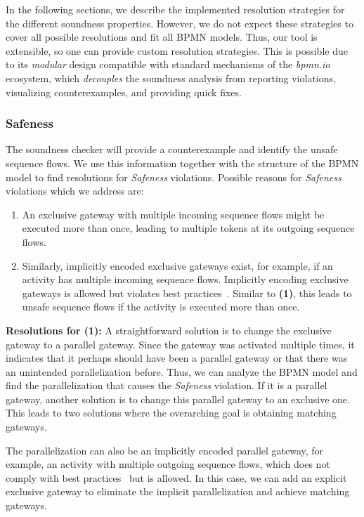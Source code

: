 \documentclass[runningheads]{llncs}
\begin{document}
In the following sections, we describe the implemented resolution strategies for the different soundness properties.
However, we do not expect these strategies to cover all possible resolutions and fit all BPMN models.
Thus, our tool is extensible, so one can provide custom resolution strategies.
This is possible due to its \textit{modular} design compatible with standard mechanisms of the \textit{bpmn.io} ecosystem, which \textit{decouples} the soundness analysis from reporting violations, visualizing counterexamples, and providing quick fixes.

\subsubsection{Safeness}
The soundness checker will provide a counterexample and identify the unsafe sequence flows.
We use this information together with the structure of the BPMN model to find resolutions for \textit{Safeness} violations.
Possible reasons for \textit{Safeness} violations which we address are:

\begin{enumerate}
	\item An exclusive gateway with multiple incoming sequence flows might be executed more than once, leading to multiple tokens at its outgoing sequence flows.
	\item Similarly, implicitly encoded exclusive gateways exist, for example, if an activity has multiple incoming sequence flows.
	Implicitly encoding exclusive gateways is allowed but violates best practices~\cite{camundaservicesgmbhBpmnlint2024}.
	Similar to \textbf{(1)}, this leads to unsafe sequence flows if the activity is executed more than once.
\end{enumerate}


\textbf{Resolutions for (1):} A straightforward solution is to change the exclusive gateway to a parallel gateway.
Since the gateway was activated multiple times, it indicates that it perhaps should have been a parallel gateway or that there was an unintended parallelization before.
Thus, we can analyze the BPMN model and find the parallelization that causes the \textit{Safeness} violation.
If it is a parallel gateway, another solution is to change this parallel gateway to an exclusive one.
This leads to two solutions where the overarching goal is obtaining matching gateways.

The parallelization can also be an implicitly encoded parallel gateway, for example, an activity with multiple outgoing sequence flows, which does not comply with best practices~\cite{camundaservicesgmbhBpmnlint2024} but is allowed.
In this case, we can add an explicit exclusive gateway to eliminate the implicit parallelization and achieve matching gateways.
\end{document}
